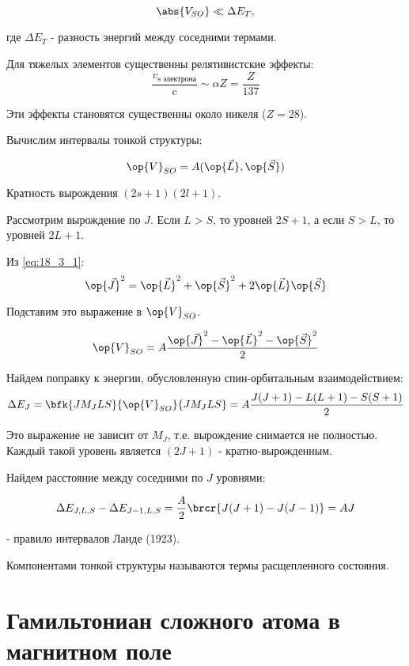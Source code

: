 \begin{equation}
\label{eq:18_4_1}
\abs{V_{SO}} \ll \Delta E_T,
\end{equation}

 где $\Delta E_T$ - разность энергий между соседними термами.
 
Для тяжелых элементов существенны релятивистские эффекты:
$$
\frac{v_{\text{s электрона}}}{c} \sim \alpha Z = \frac{Z}{137}
$$

Эти эффекты становятся существенны около никеля ($Z = 28$).

Вычислим интервалы тонкой структуры:

$$
\op{V}_{SO} = A(\op{\vec{L}}, \op{\vec{S}})
$$

Кратность вырождения $(2s + 1)(2l+1)$. 

Рассмотрим вырождение по $J$. Если $L > S$, то уровней $2S+1$, а если $S> L$, то уровней $2L+1$.

Из \eqref{eq:18_3_1}:
$$
\op{\vec{J}}^2 = \op{\vec{L}}^2 + \op{\vec{S}}^2 + 2\op{\vec{L}}\op{\vec{S}}
$$

Подставим это выражение в $\op{V}_{SO}$.

\begin{equation}
\label{eq:18_4_2}
\op{V}_{SO} = A\frac{\op{\vec{J}}^2 - \op{\vec{L}}^2 - \op{\vec{S}}^2}{2}
\end{equation}

Найдем поправку к энергии, обусловленную спин-орбитальным взаимодействием:
$$
\Delta E_J = \bfk{J M_J L S}{\op{V}_{SO}}{J M_J L S} = A \frac{J(J+1) - L(L+1) - S(S+1)}{2}
$$

Это выражение не зависит от $M_J$, т.е. вырождение снимается не полностью. Каждый такой уровень является $(2J+1)$ - кратно-вырожденным.

Найдем расстояние между соседними по $J$ уровнями:

\begin{equation}
\label{eq:18_4_3}
\Delta E_{J,L,S} - \Delta E_{J-1, L, S} = \frac{A}{2}\brcr{J(J+1) - J(J-1)} = AJ
\end{equation}

- правило интервалов Ланде (1923).

Компонентами тонкой структуры называются термы расщепленного состояния.

\section{Гамильтониан сложного атома в магнитном поле}

